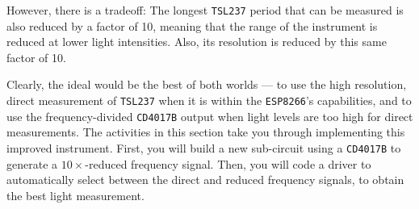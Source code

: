 However, there is a tradeoff:
The longest \texttt{TSL237} period that can be measured is also reduced by a factor of 10, meaning that the range of the instrument is reduced at lower light intensities.
Also, its resolution is reduced by this same factor of 10.

Clearly, the ideal would be the best of both worlds --- to use the high resolution, direct measurement of \texttt{TSL237} when it is within the \texttt{ESP8266}'s capabilities, and to use the frequency-divided \texttt{CD4017B} output when light levels are too high for direct measurements.
The activities in this section take you through implementing this improved instrument.
First, you will build a new sub-circuit using a \texttt{CD4017B} to generate a $10\times$-reduced frequency signal.
Then, you will code a driver to automatically select between the direct and reduced frequency signals, to obtain the best light measurement.


